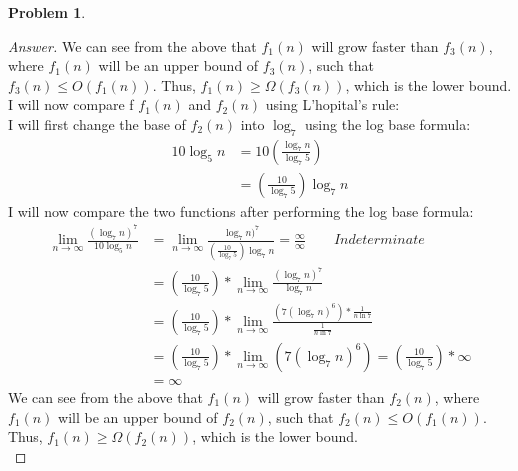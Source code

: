 \documentclass[11pt]{article}
\theoremstyle{definition}
\theoremstyle{definition}
\newtheorem{required}{Problem}
\theoremstyle{definition}
\begin{document}
\begin{required}
\begin{enumerate} [label=(\alph*)]
\begin{proof}[Answer]
We can see from the above that $f_1(n)$ will grow faster than $f_3(n)$, where $f_1(n)$ will be an upper bound of $f_3(n)$, such that $f_3(n) \leq O(f_1(n))$. Thus, $f_1(n) \geq \Omega(f_3(n))$, which is the lower bound. \\

I will now compare f $f_1(n)$ and $f_2(n)$ using L'hopital's rule:\\
I will first change the base of $f_2(n)$ into $\log_7$ using the log base formula: 
\begin{align*}
10\log_5n &= 10(\frac{\log_7n}{\log_7 5}) \\
&= (\frac{10}{\log_7 5})\log_7 n
\end{align*}
I will now compare the two functions after performing the log base formula: \\
\begin{align*}
\lim_{n \to \infty} \frac{(\log_7 n)^7}{10\log_5n} &= \lim_{n \to \infty} \frac{\log_7 n)^7}{(\frac{10}{\log_7 5})\log_7 n}  = \frac{\infty}{\infty} \qquad Indeterminate  \\
&= (\frac{10}{\log_7 5}) * \lim_{n \to \infty} \frac{(\log_7 n)^7}{\log_7 n}\\
&= (\frac{10}{\log_7 5}) * \lim_{n \to \infty} \frac{(7(\log_7 n)^6) * \frac{1}{n\ln7}}{\frac{1}{n\ln7}}\\
&= (\frac{10}{\log_7 5}) * \lim_{n \to \infty} (7(\log_7 n)^6) = (\frac{10}{\log_7 5})  * \infty\\
&= \infty
\end{align*} 
We can see from the above that $f_1(n)$ will grow faster than $f_2(n)$, where $f_1(n)$ will be an upper bound of $f_2(n)$, such that $f_2(n) \leq O(f_1(n))$. Thus, $f_1(n) \geq \Omega(f_2(n))$, which is the lower bound. \\


\end{proof}
\end{enumerate}
\end{required}
\end{document}
